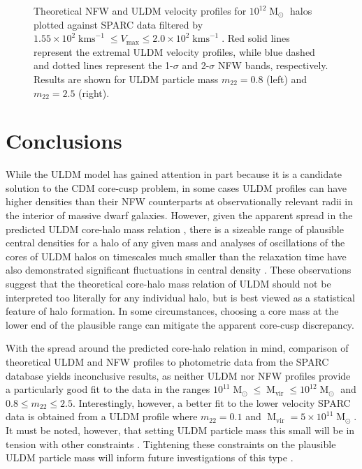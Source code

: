 \documentclass[a4paper,11pt]{article}
\begin{document}
\begin{figure}
\begin{tabular}{cc}
\end{tabular}
\caption{Theoretical NFW and ULDM velocity profiles for $10^{12}\operatorname{M}_{\odot}$ halos plotted against SPARC data filtered by $1.55\times 10^2 \operatorname{kms}^{-1}\leq V_{\mathrm{max}}\leq 2.0\times 10^2 \operatorname{kms}^{-1}$. Red solid lines represent the extremal ULDM velocity profiles, while  blue dashed and dotted lines represent the 1-$\sigma$ and 2-$\sigma$ NFW bands, respectively. Results are shown for ULDM particle mass $m_{22} = 0.8$ (left) and $m_{22} = 2.5 $ (right). }\label{fig:velocity_12}
\end{figure}







\section{Conclusions}\label{sec:conclusion}

While the ULDM model has gained attention in part because it is a candidate solution to  the CDM core-cusp problem, in some cases ULDM profiles can have higher densities than their NFW counterparts at observationally relevant radii in the interior of massive dwarf galaxies. However, given the apparent spread in the predicted ULDM core-halo mass relation \cite{Schive:2014hza}, there is a sizeable range of plausible central densities for a halo of any given mass and analyses of oscillations of the cores of ULDM halos on timescales much smaller than the relaxation time have also demonstrated significant fluctuations in central density \cite{Veltmaat:2018dfz}. These observations suggest that the theoretical core-halo mass relation of ULDM should not be interpreted too literally for any individual halo, but is best viewed as a statistical feature of halo formation. In some circumstances, choosing a core mass at the lower end of the plausible range can mitigate the apparent core-cusp discrepancy.  

With the spread around the predicted core-halo relation in mind, comparison of theoretical ULDM and NFW profiles to photometric data from the SPARC database yields inconclusive results, as neither ULDM nor NFW profiles provide a particularly good fit to the data in the ranges $10^{11}\operatorname{M}_{\odot}\leq \operatorname{M}_{\mathrm{vir}} \leq 10^{12}\operatorname{M}_{\odot}$ and $0.8 \leq m_{22} \leq 2.5$. Interestingly, however, a better fit to the lower velocity SPARC data is obtained from a ULDM profile where $m_{22} = 0.1$ and $\operatorname{M}_{\mathrm{vir}} = 5\times 10^{11}\operatorname{M}_{\odot}$. It must be noted, however, that setting ULDM particle mass this small will be in tension with other constraints \cite{Amendola:2005ad, Bozek:2014uqa, Armengaud:2017nkf, Ni:2019qfa, Nebrin:2018vqt}. Tightening these constraints on the plausible ULDM particle mass will inform future investigations of this type \cite{Castellano:2019hdd, Lidz:2018fqo, Davoudiasl:2019nlo}.
\end{document}
